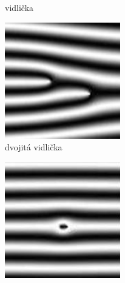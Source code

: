 \begin{figure}[h]
\begin{subfigure}[b]{0.19\linewidth}
      \caption{vidlička}
      \label{obr:markant_vidlicka}
    \end{subfigure}
    \hfill
    \begin{subfigure}[b]{0.19\linewidth}
      \includegraphics[width=\linewidth]{obrazky-figures/markanty/dvojita_vidlicka.png}
      \caption{dvojitá vidlička}
      \label{obr:markant_dvojita_vidlicka}
    \end{subfigure}
    \hfill
    \begin{subfigure}[b]{0.19\linewidth}
      \includegraphics[width=\linewidth]{obrazky-figures/markanty/bod.png}

\end{subfigure}
\end{figure}

